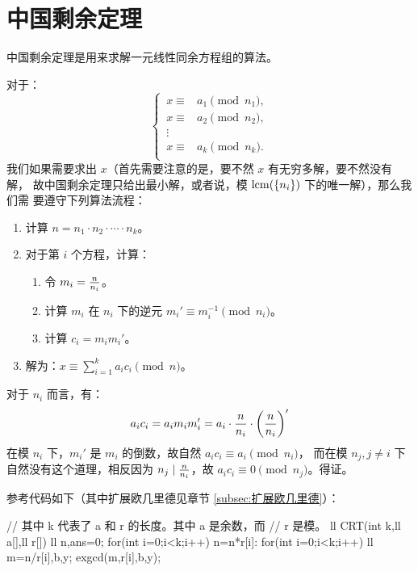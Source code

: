\section{中国剩余定理}
\label{sec:中国剩余定理}



中国剩余定理是用来求解一元线性同余方程组的算法。

对于：\[
    \left\{\,
        \begin{aligned}
            x \equiv{}&{} a_1 \pmod {n_1}, \\
            x \equiv{}&{} a_2 \pmod {n_2}, \\
              \vdots{}&{} \\
            x \equiv{}&{} a_k \pmod {n_k}. \\
        \end{aligned}
    \right.
\]我们如果需要求出 $x$（首先需要注意的是，要不然 $x$ 有无穷多解，要不然没有解，
故中国剩余定理只给出最小解，或者说，模 $\mathrm{lcm}(\{n_i\})$ 下的唯一解），那么我们需
要遵守下列算法流程：
\begin{enumerate}
    \item 计算 $n = n_1 \cdot n_2 \cdot \cdots \cdot n_k$。
    \item 对于第 $i$ 个方程，计算：
        \begin{enumerate}
            \item 令 $m_i = {n \over n_i}$。
            \item 计算 $m_i$ 在 $n_i$ 下的逆元 $m_i' \equiv m_i ^ {-1} \pmod n_i$。
            \item 计算 $c_i = m_i m_i'$。
        \end{enumerate}
    \item 解为：$x \equiv \sum_{i=1}^k a_i c_i \pmod n$。
\end{enumerate}

对于 $n_i$ 而言，有：\[
    a_i c_i = a_i m_i m_i' = a_i \cdot {n \over n_i} \cdot \left({n \over n_i}\right)'
\]在模 $n_i$ 下，$m_i'$ 是 $m_i$ 的倒数，故自然 $a_i c_i \equiv a_i \pmod {n_i}$，
而在模 $n_j, j \ne i$ 下自然没有这个道理，相反因为 $n_j \mid {n \over n_i}$，故
$a_i c_i \equiv 0 \pmod {n_j}$。得证。

参考代码如下（其中扩展欧几里德见章节 \ref{subsec:扩展欧几里德}）：
\begin{Cpp}
// 其中 k 代表了 a 和 r 的长度。其中 a 是余数，而
// r 是模。
ll CRT(int k,ll a[],ll r[]){
  ll n,ans=0;
  for(int i=0;i<k;i++) n=n*r[i]:
  for(int i=0;i<k;i++) {
    ll m=n/r[i],b,y;
    exgcd(m,r[i],b,y);
  }
}
\end{Cpp}



